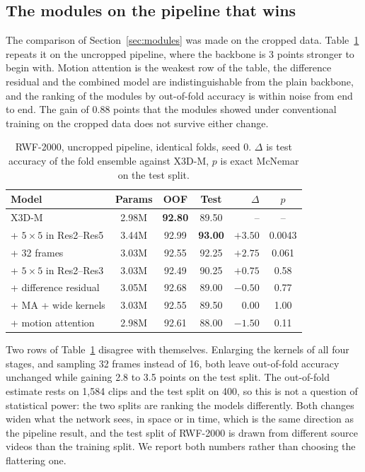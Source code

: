 \documentclass[conference]{IEEEtran}
\begin{document}
\subsection{The modules on the pipeline that wins}
\label{sec:modules-clean}

The comparison of Section~\ref{sec:modules} was made on the cropped data.
Table~\ref{tab:modules-clean} repeats it on the uncropped pipeline, where
the backbone is 3 points stronger to begin with. Motion attention is the
weakest row of the table, the difference residual and the combined model
are indistinguishable from the plain backbone, and the ranking of the
modules by out-of-fold accuracy is within noise from end to end. The gain
of 0.88 points that the modules showed under conventional training on the
cropped data does not survive either change.

\begin{table}[t]
  \centering
  \caption{RWF-2000, uncropped pipeline, identical folds, seed 0. $\Delta$
  is test accuracy of the fold ensemble against X3D-M, $p$ is exact
  McNemar on the test split.}
  \label{tab:modules-clean}
  \setlength{\tabcolsep}{3pt}
  \begin{tabular}{lcccrc}
    \toprule
    Model & Params & OOF & Test & $\Delta$ & $p$ \\
    \midrule
    X3D-M                       & 2.98M & \textbf{92.80} & 89.50 & --      & --     \\
    \;+ $5\times5$ in Res2--Res5 & 3.44M & 92.99 & \textbf{93.00} & $+3.50$ & 0.0043 \\
    \;+ 32 frames               & 3.03M & 92.55 & 92.25 & $+2.75$ & 0.061  \\
    \;+ $5\times5$ in Res2--Res3 & 3.03M & 92.49 & 90.25 & $+0.75$ & 0.58   \\
    \;+ difference residual     & 3.05M & 92.68 & 89.00 & $-0.50$ & 0.77   \\
    \;+ MA + wide kernels       & 3.03M & 92.55 & 89.50 & $0.00$  & 1.00   \\
    \;+ motion attention        & 2.98M & 92.61 & 88.00 & $-1.50$ & 0.11   \\
    \bottomrule
  \end{tabular}
\end{table}

Two rows of Table~\ref{tab:modules-clean} disagree with themselves.
Enlarging the kernels of all four stages, and sampling 32 frames instead
of 16, both leave out-of-fold accuracy unchanged while gaining 2.8 to 3.5
points on the test split. The out-of-fold estimate rests on 1,584 clips
and the test split on 400, so this is not a question of statistical power:
the two splits are ranking the models differently. Both changes widen what
the network sees, in space or in time, which is the same direction as the
pipeline result, and the test split of RWF-2000 is drawn from different
source videos than the training split. We report both numbers rather than
choosing the flattering one.
\end{document}
